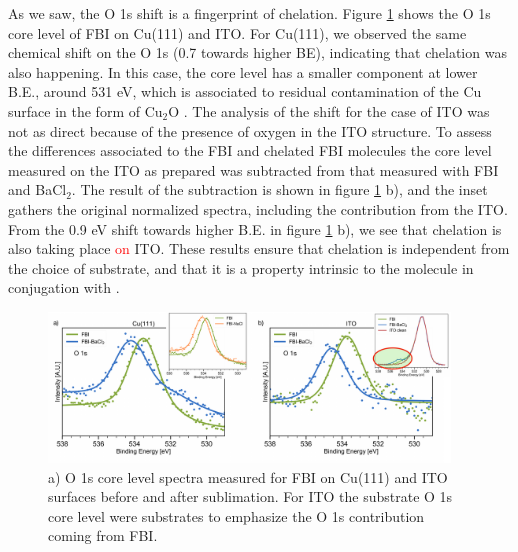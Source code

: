 \documentclass[aps,prl,reprint,longbibliography,superscriptaddress, english]{revtex4-1}
\begin{document}
As we saw, the O 1s shift is a fingerprint of chelation. Figure \ref{XPS_FBI_Cu_ITO} shows the O 1s core level of FBI on Cu(111) and ITO. For Cu(111), we observed the same chemical shift on the O 1s (0.7 towards higher BE), indicating that chelation was also happening. In this case, the core level has a smaller component at lower B.E., around 531 eV, which is associated to residual contamination of the Cu surface in the form of Cu$_2$O \cite{zhu_surface_2013}.
The analysis of the shift for the case of ITO was not as direct because of the presence of oxygen in the ITO structure. To assess the differences associated to the FBI and chelated FBI molecules the core level measured on the ITO as prepared  was subtracted from that measured with FBI and BaCl$_2$. The result of the subtraction is shown in figure \ref{XPS_FBI_Cu_ITO} b), and the inset gathers the original normalized spectra, including the contribution from the ITO. From the 0.9 eV shift towards higher B.E. in figure \ref{XPS_FBI_Cu_ITO} b), we see that chelation is also taking place \textcolor{red}{on} ITO. These results ensure that chelation is independent from the choice of substrate, and that it is a property intrinsic to the molecule in conjugation with \Bapp. 


\begin{figure}[ht!]
	\includegraphics[width=0.95\textwidth]{figures/fig5_cu_ito.pdf}
	\caption{\label{XPS_FBI_Cu_ITO} 
    a) O 1s core level spectra measured for FBI on Cu(111) and ITO surfaces before and after \Bapp sublimation. For ITO the substrate O 1s core level were substrates to emphasize the O 1s contribution coming from FBI.}
\end{figure}  
\end{document}
